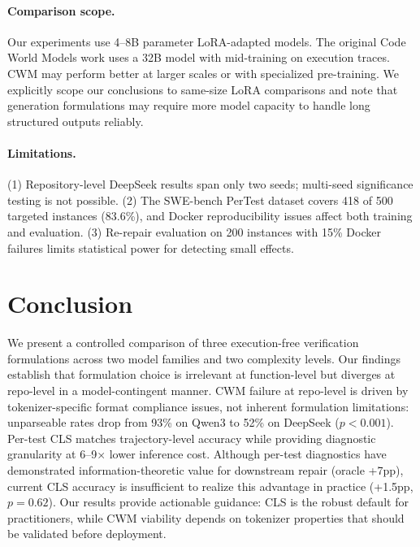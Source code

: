\documentclass[11pt]{article}
\begin{document}
\paragraph{Comparison scope.} Our experiments use 4--8B parameter LoRA-adapted models. The original Code World Models work uses a 32B model with mid-training on execution traces. CWM may perform better at larger scales or with specialized pre-training. We explicitly scope our conclusions to same-size LoRA comparisons and note that generation formulations may require more model capacity to handle long structured outputs reliably.

\paragraph{Limitations.} (1) Repository-level DeepSeek results span only two seeds; multi-seed significance testing is not possible. (2) The SWE-bench PerTest dataset covers 418 of 500 targeted instances (83.6\%), and Docker reproducibility issues affect both training and evaluation. (3) Re-repair evaluation on 200 instances with 15\% Docker failures limits statistical power for detecting small effects.

\section{Conclusion}

We present a controlled comparison of three execution-free verification formulations across two model families and two complexity levels. Our findings establish that formulation choice is irrelevant at function-level but diverges at repo-level in a model-contingent manner. CWM failure at repo-level is driven by tokenizer-specific format compliance issues, not inherent formulation limitations: unparseable rates drop from 93\% on Qwen3 to 52\% on DeepSeek ($p{<}0.001$). Per-test CLS matches trajectory-level accuracy while providing diagnostic granularity at 6--9$\times$ lower inference cost. Although per-test diagnostics have demonstrated information-theoretic value for downstream repair (oracle +7pp), current CLS accuracy is insufficient to realize this advantage in practice (+1.5pp, $p{=}0.62$). Our results provide actionable guidance: CLS is the robust default for practitioners, while CWM viability depends on tokenizer properties that should be validated before deployment.


\end{document}

